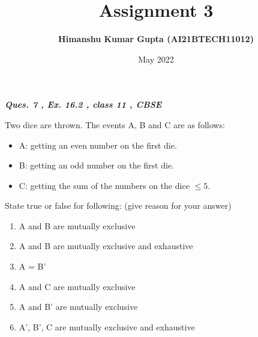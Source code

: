 \documentclass[journal,12pt,twocolumn]{IEEEtran}
\begin{document}
\newcommand{\myvec}[1]{\ensuremath{\begin{pmatrix}#1\end{pmatrix}}}
\let\vec\mathbf

\title{Assignment 3}
\author{\textbf{Himanshu Kumar Gupta (AI21BTECH11012)}}
\maketitle
\date {May 2022}

\textbf{\textit{Ques. 7 , Ex. 16.2 , class 11 , CBSE}}

Two dice are thrown. The events A, B and C are as follows:

\begin{itemize}
\item A: getting an even number on the first die.
\item B: getting an odd number on the first die.
\item C: getting the sum of the numbers on the dice $\leq5$.
\end{itemize}
 State true or false for following: (give reason for your answer)
 
 \begin{enumerate}
\item A and B are mutually exclusive
 
\item A and B are mutually exclusive and exhaustive

\item A = B'

\item A and C are mutually exclusive

\item A and B' are mutually exclusive

\item A', B', C are mutually exclusive and exhaustive
\end{enumerate}
\end{document}
